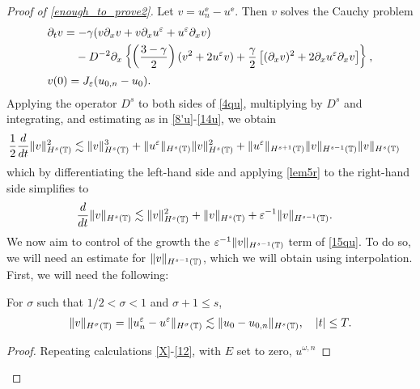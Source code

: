 \begin{proof}[Proof of \eqref{enough_to_prove2}] Let $v = u^\ee_n - u^\ee$. Then 
$v$ solves the Cauchy problem
\begin{align}
\label{4qu}
& \p_t v  =  -\gamma (v \p_x v + v \p_x u^\ee + u^\ee \p_x v)  \\
& \phantom{\p_t v  =} - D^{-2} \p_x \left\{\left (\frac{3-\gamma}{2} \right )(v^2 +
2u^\ee v) + \frac{\gamma}{2}\left[ (\p_x v)^2 + 2 \p_x u^\ee \p_x v \right]
\right\}, \notag
\\
& v(0) =J_\ee(u_{0,n} - u_0).
\label{5qu}
\end{align}
Applying the operator $D^s$ to both sides of \eqref{4qu}, multiplying by
$D^s$ and integrating, and estimating as in \eqref{8'u}-\eqref{14u}, we 
obtain
%
%
\begin{equation*}
\begin{split}
\frac{1}{2}\frac{d}{dt}\|v\|_{H^{s}(\mathbb{T})}^2
& \lesssim \|v\|_{H^s(\mathbb{T})}^3 + \|u^\varepsilon\|_{H^s(\mathbb{T})}
\|v\|_{H^s(\mathbb{T})}^2
 + \|u^\varepsilon\|_{H^{s+1}(\mathbb{T})}
\|v\|_{H^{s-1}(\mathbb{T})} \|v\|_{H^s(\mathbb{T})}
\end{split}
\end{equation*}
%
%
which by differentiating the left-hand side and applying \cref{lem5r} to 
the right-hand side simplifies to
\begin{equation}
\begin{split}
\frac{d}{dt}\|v\|_{H^{s}(\mathbb{T})}
& \lesssim \|v\|_{H^s(\mathbb{T})}^2 + \|v\|_{H^s(\mathbb{T})}
+ \varepsilon^{-1}
\|v\|_{H^{s-1}(\mathbb{T})}.
\label{15qu}
\end{split}
\end{equation}
%
%
We now aim to control of the growth the $\varepsilon^{-1}
\|v\|_{H^{s-1}(\mathbb{T})}$ term of \eqref{15qu}. To do so, we will need an estimate for
$\|v\|_{H^{s-1}(\mathbb{T})}$, which we will obtain using interpolation. First, 
we will need the following:
%
%
%
%
\begin{proposition}
\label{prop:left}
For $\sigma$ such that $1/2 < \sigma < 1$ and $\sigma + 1 \le s$, 
%
%
\begin{equation}
\label{prop:6rq}
\begin{split}
\|v\|_{H^{\sigma}(\mathbb{T})} = \|u^\varepsilon_n - u^\varepsilon\|_{H^\sigma(\mathbb{T})}
\lesssim \|u_0 - u_{0,n} \|_{H^s(\mathbb{T})}, \quad |t| \le T.
\end{split}
\end{equation}
%
%
\end{proposition}
%
%
%
\begin{proof}
Repeating calculations \eqref{X}-\eqref{12}, with $E$ set to zero, 
$u^{\omega,n}$

\end{proof}
\end{proof}
